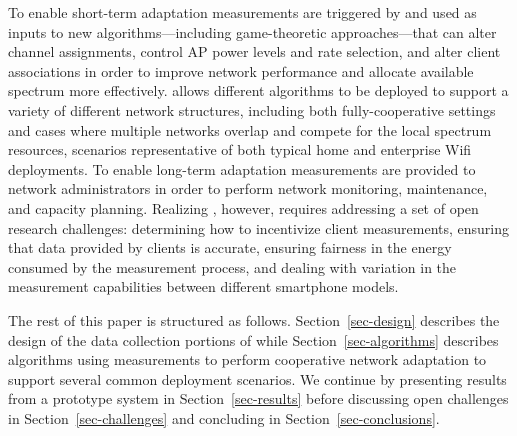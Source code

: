 To enable short-term adaptation measurements are triggered by and used as
inputs to new algorithms---including game-theoretic approaches---that can
alter channel assignments, control AP power levels and rate selection, and
alter client associations in order to improve network performance and
allocate available spectrum more effectively. \PS{} allows different
algorithms to be deployed to support a variety of different network
structures, including both fully-cooperative settings and cases where
multiple networks overlap and compete for the local spectrum resources,
scenarios representative of both typical home and enterprise Wifi
deployments. To enable long-term adaptation measurements are provided to
network administrators in order to perform network monitoring, maintenance,
and capacity planning. Realizing \PS{}, however, requires addressing a set of
open research challenges: determining how to incentivize client measurements,
ensuring that data provided by clients is accurate, ensuring fairness in the
energy consumed by the measurement process, and dealing with variation in the
measurement capabilities between different smartphone models.

The rest of this paper is structured as follows. Section~\ref{sec-design}
describes the design of the data collection portions of \PS{} while
Section~\ref{sec-algorithms} describes algorithms using \PS{} measurements to
perform cooperative network adaptation to support several common deployment
scenarios. We continue by presenting results from a prototype \PS{} system in
Section~\ref{sec-results} before discussing open challenges in
Section~\ref{sec-challenges} and concluding in Section~\ref{sec-conclusions}.
